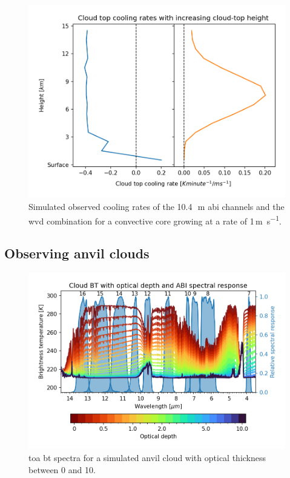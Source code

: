 \begin{figure}[t]
    \includegraphics[width=\textwidth]{figures/chapter1_07.png}
    \caption[
    Simulated observed cooling rates of the 10.4\,\unit{\mu m} \acrshort{abi} channels and the \acrshort{wvd} combination for a convective core growing at a rate of 1\,\unit{m s^{-1}}
    ]{
    Simulated observed cooling rates of the 10.4\,\unit{\mu m} \acrshort{abi} channels and the \acrshort{wvd} combination for a convective core growing at a rate of 1\,\unit{m s^{-1}}.
    }
    \label{fig:cloud_height_cooling_rates}
\end{figure}

\subsection{Observing anvil clouds}

\begin{figure}[t]
    \includegraphics[width=\textwidth]{figures/chapter1_08.png}
    \caption[
    \acrshort{toa} \acrshort{bt} spectra for a simulated anvil cloud with optical thickness between 0 and 10
    ]{
    \acrshort{toa} \acrshort{bt} spectra for a simulated anvil cloud with optical thickness between 0 and 10. 
    }
    \label{fig:optical_depth_spectra}
\end{figure}


